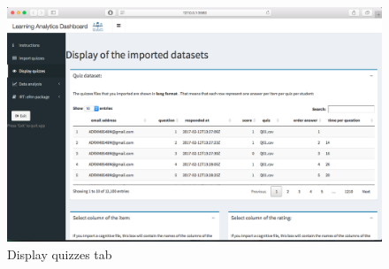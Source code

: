 \begin{figure}[ht!]
\centering
\includegraphics[width=\linewidth]{img/d_3_1.png}
\caption{Display quizzes tab}
\label{img:d_3_1}
\end{figure}

